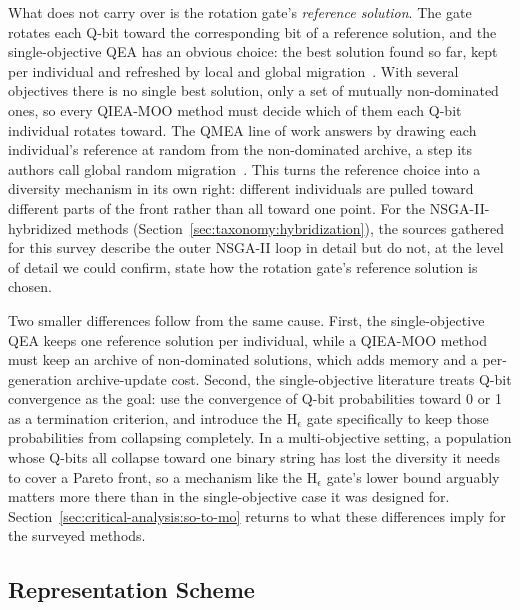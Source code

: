 What does not carry over is the rotation gate's \emph{reference
solution}. The gate rotates each Q-bit toward the corresponding bit of a
reference solution, and the single-objective QEA has an obvious choice:
the best solution found so far, kept per individual and refreshed by
local and global migration~\citep{han2002qea}. With several objectives
there is no single best solution, only a set of mutually non-dominated
ones, so every QIEA-MOO method must decide which of them each Q-bit
individual rotates toward. The QMEA line of work answers by drawing each
individual's reference at random from the non-dominated archive, a step
its authors call global random migration~\citep{ryu2014dmqea}. This turns
the reference choice into a diversity mechanism in its own right:
different individuals are pulled toward different parts of the front
rather than all toward one point. For the NSGA-II-hybridized methods
(Section~\ref{sec:taxonomy:hybridization}), the sources gathered for
this survey describe the outer NSGA-II loop in detail but do not, at
the level of detail we could confirm, state how the rotation gate's
reference solution is chosen.

Two smaller differences follow from the same cause. First, the
single-objective QEA keeps one reference solution per individual, while
a QIEA-MOO method must keep an archive of non-dominated solutions, which
adds memory and a per-generation archive-update cost. Second, the
single-objective literature treats Q-bit convergence as the goal:
\citet{han2004hepsilon} use the convergence of Q-bit probabilities
toward 0 or 1 as a termination criterion, and introduce the
H$_\epsilon$ gate specifically to keep those probabilities from
collapsing completely. In a multi-objective setting, a population
whose Q-bits all collapse toward one binary string has lost the
diversity it needs to cover a Pareto front, so a mechanism like the
H$_\epsilon$ gate's lower bound arguably matters more there than in the
single-objective case it was designed for. Section~\ref{sec:critical-analysis:so-to-mo}
returns to what these differences imply for the surveyed methods.

\subsection{Representation Scheme}
\label{sec:taxonomy:representation}

